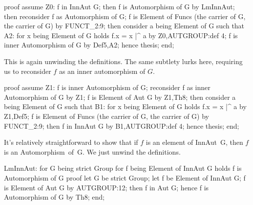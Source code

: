 \nwenddocs{}\endmoddef\nwstartdeflinemarkup{}\nwenddeflinemarkup
proof
  assume Z0: f in InnAut G;
  then f is Automorphism of G by LmInnAut;
  then reconsider f as Automorphism of G;
  f is Element of Funcs (the carrier of G, the carrier of G) by FUNCT_2:9;
  then consider a being Element of G such that
  A2: for x being Element of G holds f.x = x |^ a
  by Z0,AUTGROUP:def 4;
  f is inner Automorphism of G by Def5,A2;
  hence thesis;
end;

\nwendcode{}\nwdocspar

This is again unwinding the definitions. The same subtlety lurks here,
requiring us to reconsider $f$ as an inner automorphism of $G$.

\nwenddocs{}\endmoddef\nwstartdeflinemarkup{}\nwenddeflinemarkup
proof
  assume Z1: f is inner Automorphism of G;
  reconsider f as inner Automorphism of G by Z1;
  f is Element of Aut G by Z1,Th8;
  then consider a being Element of G such that
  B1: for x being Element of G holds f.x = x |^ a
  by Z1,Def5;
  f is Element of Funcs (the carrier of G, the carrier of G) by FUNCT_2:9;
  then f in InnAut G by B1,AUTGROUP:def 4;
  hence thesis;
end;

\nwendcode{}\nwdocspar

\M
It's relatively straightforward to show that if $f$ is an element of
{\Tt{}InnAut\ G\nwendquote}, then $f$ is an {\Tt{}Automorphism\ of\ G\nwendquote}. We just unwind the
definitions.

\nwenddocs{}\endmoddef\nwstartdeflinemarkup{}\nwenddeflinemarkup
LmInnAut:
  for G being strict Group
  for f being Element of InnAut G
  holds f is Automorphism of G
proof
  let G be strict Group;
  let f be Element of InnAut G;
  f is Element of Aut G by AUTGROUP:12;
  then f in Aut G;
  hence f is Automorphism of G by Th8;
end;

